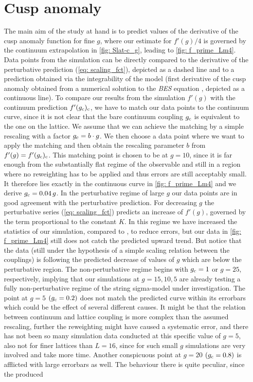 \section{Cusp anomaly}
The main aim of the study at hand is to predict values  of the derivative of the cusp anomaly function for fine $g$, where our estimate for $f'(g)/4$ is governed by the continuum extrapolation in \autoref{fig: Slat-c_g}, leading to \autoref{fig: f_prime_Lm4}. Data points from the simulation can be directly compared to the derivative of the perturbative prediction (\ref{eq: scaling_fct}), depicted as a dashed line and to a prediction obtained via the integrability of the model (first derivative of the cusp anomaly obtained from a numerical solution to the \textit{BES} equation \cite{Beisert:2006ez}, depicted as a continuous line). To compare our results from the simulation $f'(g)$ with the continuum prediction $f'(g_{\rm c})_{\rm c}$, we have to match our data points to the continuum curve, since it is not clear that the bare continuum coupling $g_{\rm c}$ is equivalent to the one on the lattice. We assume that we can achieve the matching by a simple rescaling with a factor $g_{\rm c}= b\cdot g$. We then choose a data point where we want to apply the matching and then obtain the rescaling parameter $b$ from $f'(g)=f'(g_{\rm c})_{\rm c}$. This matching point is chosen to be at $g=10$, since it is far enough from the substantially flat regime of the observable and still in a region where no reweighting has to be applied and thus errors are still acceptably small. It therefore lies exactly in the continuous curve in \autoref{fig: f_prime_Lm4} and we derive $g_{\rm c}=0.04 \,g$. In the perturbative regime of large $g$ our data points are in good agreement with the perturbative prediction. For decreasing $g$ the perturbative series (\ref{eq: scaling_fct}) predicts an increase of $f'(g)$, governed by the term proportional to the  constant $K$. In this regime we have increased the statistics of our simulation, compared to \cite{Bianchi:2016cyv}, to reduce errors, but our data in \autoref{fig: f_prime_Lm4} still does not catch the predicted upward trend. But notice that the data (still under the hypothesis of a simple scaling relation between the couplings) is following the predicted decrease of values of $g$ which are below the perturbative region. The non-perturbative regime begins with $g_{\rm c}=1$ or $g=25$, respectively, implying that our simulations at $g=15,10,5$ are already testing a fully non-perturbative regime of the string sigma-model under investigation. The point at $g=5$ $(g_{\rm c}=0.2)$ does not match the predicted curve within its errorbars which could be the effect of several different causes. It might be that the relation between continuum and lattice coupling is more complex than the assumed rescaling, further the reweighting might have caused a systematic error, and there has not been so many simulation data conducted at this specific value of $g=5$, also not for finer lattices than $L=16$, since for such small $g$ simulations are very involved and take more time. Another conspicuous point at $g=20$ $(g_{\rm c}=0.8)$ is afflicted with large errorbars as well. The behaviour there is quite peculiar, since the produced 